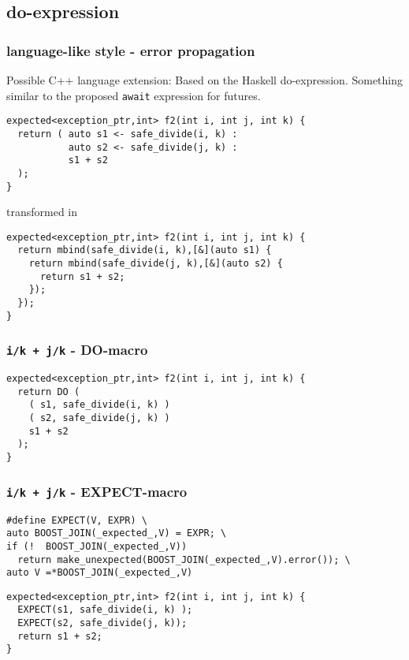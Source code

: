 \documentclass[xcolor=dvipsnames]{beamer}
\newcommand{\cpp}[1]{\lstinline{#1}}
\begin{document}
\subsection{do-expression}
\begin{frame}[fragile]
\frametitle{language-like style  - error propagation}
Possible C++ language extension: Based on the Haskell do-expression. Something similar to the proposed \cpp{await} expression for futures.  

\begin{lstlisting}
expected<exception_ptr,int> f2(int i, int j, int k) {
  return ( auto s1 <- safe_divide(i, k) :
           auto s2 <- safe_divide(j, k) :
           s1 + s2  
  );
}
\end{lstlisting}

transformed in 

\begin{lstlisting}
expected<exception_ptr,int> f2(int i, int j, int k) {
  return mbind(safe_divide(i, k),[&](auto s1) {
    return mbind(safe_divide(j, k),[&](auto s2) {
      return s1 + s2;
    });
  }); 
}
\end{lstlisting}
\end{frame}
\begin{frame}[fragile]
\frametitle{\cpp{i/k + j/k}  - DO-macro}

\begin{lstlisting}
expected<exception_ptr,int> f2(int i, int j, int k) {
  return DO (
    ( s1, safe_divide(i, k) )
    ( s2, safe_divide(j, k) )
    s1 + s2 
  );
}
\end{lstlisting}

\end{frame}
\begin{frame}[fragile]
\frametitle{\cpp{i/k + j/k}  - EXPECT-macro}

\begin{lstlisting}
#define EXPECT(V, EXPR) \
auto BOOST_JOIN(_expected_,V) = EXPR; \
if (!  BOOST_JOIN(_expected_,V)) 
  return make_unexpected(BOOST_JOIN(_expected_,V).error()); \
auto V =*BOOST_JOIN(_expected_,V)
\end{lstlisting}

\begin{lstlisting}
expected<exception_ptr,int> f2(int i, int j, int k) {
  EXPECT(s1, safe_divide(i, k) );
  EXPECT(s2, safe_divide(j, k));
  return s1 + s2;
}
\end{lstlisting}

\end{frame}
\end{document}
